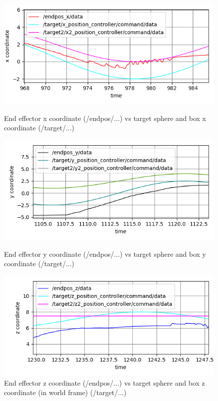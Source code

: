\documentclass[11pt]{report}
\begin{document}
\begin{figure}[H]

  \centering
  \begin{minipage}[b]{0.44\textwidth}
    \includegraphics[width=\textwidth]{4.2.x.png}
    \caption{End effector x coordinate (/endpos/...) vs target sphere and box x coordinate (/target/...)}
  \end{minipage}
  \hfill
  \begin{minipage}[b]{0.44\textwidth}
    \includegraphics[width=\textwidth]{4.2.y.png}
    \caption{End effector y coordinate (/endpos/...) vs target sphere and box y coordinate (/target/...)}
  \end{minipage}
\begin{minipage}[b]{0.44\textwidth}
    \includegraphics[width=\textwidth]{4.2.z.png}
    \caption{End effector z coordinate (/endpos/...) vs target sphere and box z coordinate (in world frame) (/target/...)}
  \end{minipage}
\end{figure}
\end{document}
